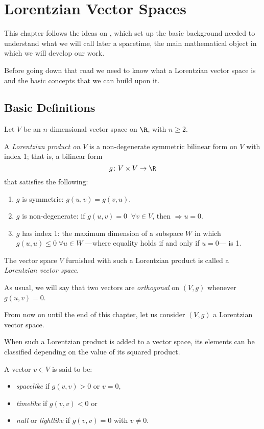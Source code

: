 \chapter{Lorentzian Vector Spaces}
\label{chapter:lorentzian}

This chapter follows the ideas on \cite{romero10}, which set up the basic background needed to understand what we will call later a spacetime, the main mathematical object in which we will develop our work.

Before going down that road we need to know what a Lorentzian vector space is and the basic concepts that we can build upon it.

\section{Basic Definitions}

\begin{definition}
	\label{def:lorentzianprod}
	Let $V$ be an $n$-dimensional vector space on $\R$, with $n \geq 2$.
	
	A \emph{Lorentzian product on $V$} is a non-degenerate symmetric bilinear form on $V$ with index 1; that is, a bilinear form
	\[
		g \colon V \times V \to \R
	\]
	that satisfies the following:
	\begin{enumerate}
		\item $g$ is symmetric: $g(u, v) = g(v, u)$.
		\item $g$ is non-degenerate: if $g(u, v) = 0 \;\; \forall v \in V$, then $\Rightarrow u = 0$.
		\item $g$ has index 1: the maximum dimension of a subspace $W$ in which $g(u,u) \leq 0 \; \forall u \in W$ ---where equality holds if and only if $u = 0$--- is 1.
	\end{enumerate}

	The vector space $V$ furnished with such a Lorentzian product is called a \emph{Lorentzian vector space}.
\end{definition}

As usual, we will say that two vectors are \emph{orthogonal} on $(V,g)$ whenever $g(u,v) = 0$.

From now on until the end of this chapter, let us consider $(V,g)$ a Lorentzian vector space.

When such a Lorentzian product is added to a vector space, its elements can be classified depending on the value of its squared product.

\begin{definition}
	A vector $v \in V$ is said to be:
	\begin{itemize}
		\item \emph{spacelike} if $g(v,v) > 0$ or $v = 0$,
		\item \emph{timelike} if $g(v,v) < 0$ or
		\item \emph{null} or \emph{lightlike} if $g(v,v) = 0$ with $v \neq 0$.
	\end{itemize}
\end{definition}


